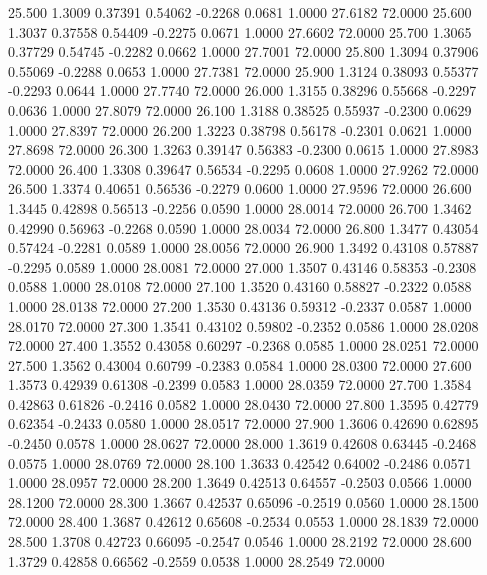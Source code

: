   25.500   1.3009   0.37391   0.54062  -0.2268   0.0681   1.0000  27.6182  72.0000
  25.600   1.3037   0.37558   0.54409  -0.2275   0.0671   1.0000  27.6602  72.0000
  25.700   1.3065   0.37729   0.54745  -0.2282   0.0662   1.0000  27.7001  72.0000
  25.800   1.3094   0.37906   0.55069  -0.2288   0.0653   1.0000  27.7381  72.0000
  25.900   1.3124   0.38093   0.55377  -0.2293   0.0644   1.0000  27.7740  72.0000
  26.000   1.3155   0.38296   0.55668  -0.2297   0.0636   1.0000  27.8079  72.0000
  26.100   1.3188   0.38525   0.55937  -0.2300   0.0629   1.0000  27.8397  72.0000
  26.200   1.3223   0.38798   0.56178  -0.2301   0.0621   1.0000  27.8698  72.0000
  26.300   1.3263   0.39147   0.56383  -0.2300   0.0615   1.0000  27.8983  72.0000
  26.400   1.3308   0.39647   0.56534  -0.2295   0.0608   1.0000  27.9262  72.0000
  26.500   1.3374   0.40651   0.56536  -0.2279   0.0600   1.0000  27.9596  72.0000
  26.600   1.3445   0.42898   0.56513  -0.2256   0.0590   1.0000  28.0014  72.0000
  26.700   1.3462   0.42990   0.56963  -0.2268   0.0590   1.0000  28.0034  72.0000
  26.800   1.3477   0.43054   0.57424  -0.2281   0.0589   1.0000  28.0056  72.0000
  26.900   1.3492   0.43108   0.57887  -0.2295   0.0589   1.0000  28.0081  72.0000
  27.000   1.3507   0.43146   0.58353  -0.2308   0.0588   1.0000  28.0108  72.0000
  27.100   1.3520   0.43160   0.58827  -0.2322   0.0588   1.0000  28.0138  72.0000
  27.200   1.3530   0.43136   0.59312  -0.2337   0.0587   1.0000  28.0170  72.0000
  27.300   1.3541   0.43102   0.59802  -0.2352   0.0586   1.0000  28.0208  72.0000
  27.400   1.3552   0.43058   0.60297  -0.2368   0.0585   1.0000  28.0251  72.0000
  27.500   1.3562   0.43004   0.60799  -0.2383   0.0584   1.0000  28.0300  72.0000
  27.600   1.3573   0.42939   0.61308  -0.2399   0.0583   1.0000  28.0359  72.0000
  27.700   1.3584   0.42863   0.61826  -0.2416   0.0582   1.0000  28.0430  72.0000
  27.800   1.3595   0.42779   0.62354  -0.2433   0.0580   1.0000  28.0517  72.0000
  27.900   1.3606   0.42690   0.62895  -0.2450   0.0578   1.0000  28.0627  72.0000
  28.000   1.3619   0.42608   0.63445  -0.2468   0.0575   1.0000  28.0769  72.0000
  28.100   1.3633   0.42542   0.64002  -0.2486   0.0571   1.0000  28.0957  72.0000
  28.200   1.3649   0.42513   0.64557  -0.2503   0.0566   1.0000  28.1200  72.0000
  28.300   1.3667   0.42537   0.65096  -0.2519   0.0560   1.0000  28.1500  72.0000
  28.400   1.3687   0.42612   0.65608  -0.2534   0.0553   1.0000  28.1839  72.0000
  28.500   1.3708   0.42723   0.66095  -0.2547   0.0546   1.0000  28.2192  72.0000
  28.600   1.3729   0.42858   0.66562  -0.2559   0.0538   1.0000  28.2549  72.0000

